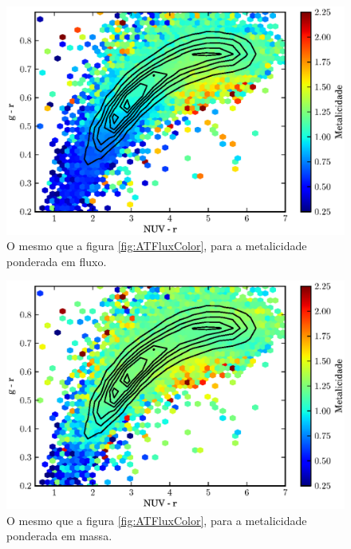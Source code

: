 \begin{figure}
	\includegraphics{figuras/uvcolor-color-am_flux.eps}
	\caption[Metalicidade das galáxias ponderada em fluxo no diagrama cor--cor UV.]
	{O mesmo que a figura \ref{fig:ATFluxColor}, para a metalicidade ponderada em
	fluxo.}
	\label{fig:AMFluxColor}
\end{figure}

\begin{figure}
	\includegraphics{figuras/uvcolor-color-am_mass.eps}
	\caption[Metalicidade das galáxias ponderada em massa no diagrama cor--cor UV.]
	{O mesmo que a figura \ref{fig:ATFluxColor}, para a metalicidade ponderada em
	massa.}
	\label{fig:AMMassColor}
\end{figure}

